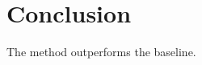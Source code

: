 \documentclass{article}
\begin{document}
\begin{abstract}
Candidate significantly improves exact match over the baseline.
\end{abstract}
\section{Conclusion}
The method outperforms the baseline.
\end{document}
